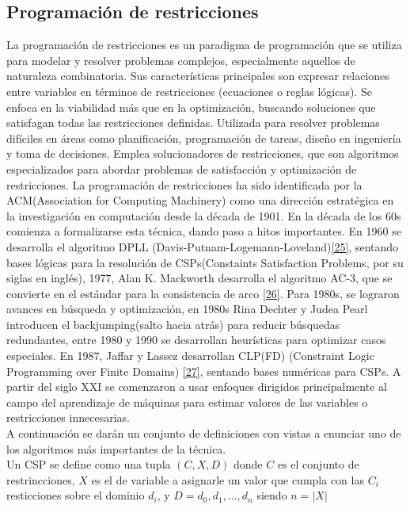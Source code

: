     \subsection*{ \Large Programación de restricciones}

La programación de restricciones es un paradigma de programación que se utiliza para modelar y resolver problemas complejos, especialmente aquellos de naturaleza
combinatoria. Sus características principales son expresar relaciones entre variables en términos de restricciones (ecuaciones o reglas lógicas). Se enfoca en la
viabilidad más que en la optimización, buscando soluciones que satisfagan todas las restricciones definidas. Utilizada para resolver problemas difíciles en áreas
como planificación, programación de tareas, diseño en ingeniería y toma de decisiones. Emplea solucionadores de restricciones, que son algoritmos especializados
para abordar problemas de satisfacción y optimización de restricciones. La programación de restricciones ha sido identificada por la ACM(Association for Computing Machinery) como una dirección estratégica
en la investigación en computación desde la década de 1901. En la década de los 60s comienza a formalizarse esta técnica, dando paso a hitos importantes. En 1960
se desarrolla el algoritmo DPLL (Davis-Putnam-Logemann-Loveland)\hyperref[sec:35]{[25]}, sentando bases lógicas para la resolución de CSPs(Constaints Satisfaction Problems, por su siglas en inglés), 1977, Alan K. Mackworth
desarrolla el algoritmo AC-3, que se convierte en el estándar para la consistencia de arco \hyperref[sec:36]{[26]}. Para 1980s, se lograron avances en búsqueda y optimización, en 1980s Rina
Dechter y Judea Pearl introducen el backjumping(salto hacia atrás) para reducir búsquedas redundantes, entre 1980 y 1990 se desarrollan heurísticas para optimizar
casos especiales. En 1987, Jaffar y Lassez desarrollan CLP(FD) (Constraint Logic Programming over Finite Domains) \hyperref[sec:37]{[27]}, sentando bases numéricas para CSPs. A partir del siglo XXI se comenzaron a usar
enfoques dirigidos principalmente al campo del aprendizaje de máquinas para estimar valores de las variables o restricciones innecesarias. \\

A continuación se darán un conjunto de definiciones con vistas a enunciar uno de los algoritmos más importantes de la técnica. \\

Un CSP se define como una tupla $(C,X,D)$ donde $C$ es el conjunto de restrincciones, $X$ es el de variable a asignarle un valor que cumpla con las $C_i$ resticciones 
sobre el dominio $d_i$, y $D={d_0,d_1,...,d_n}$ siendo $n=|X|$ \\

